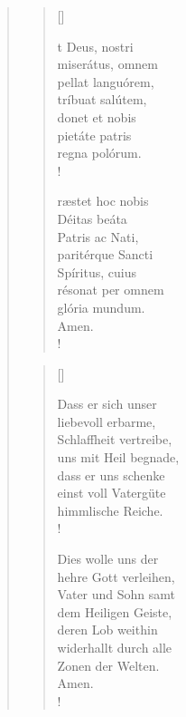 \begin{quote}

\begin{multicols}{2}
\begin{verse}[\versewidth]

{\normalsize{t Deus, nostri\\
miserátus, omnem\\
pellat languórem,\\
tríbuat salútem, \\
donet et nobis\\
pietáte patris\\
regna polórum.\\!
	
	
ræstet hoc nobis\\
Déitas beáta\\
Patris ac Nati,\\
paritérque Sancti\\
Spíritus, cuius\\
résonat per omnem\\
glória mundum.\\
Amen.\\!}}
\end{verse}

\columnbreak

\begin{verse}[\versewidth]
{\normalsize\rm{ Dass er sich unser\\
liebevoll erbarme,\\
Schlaffheit vertreibe,\\
uns mit Heil begnade,\\
dass er uns schenke\\
einst voll Vatergüte\\
himmlische Reiche.\\!

 Dies wolle uns der\\ 
hehre Gott verleihen,\\
Vater und Sohn samt\\
dem Heiligen Geiste,\\
deren Lob weithin\\
widerhallt durch alle\\ 
Zonen der Welten.\\
Amen.\\!}}

\end{verse}
\end{multicols}

\end{quote}


